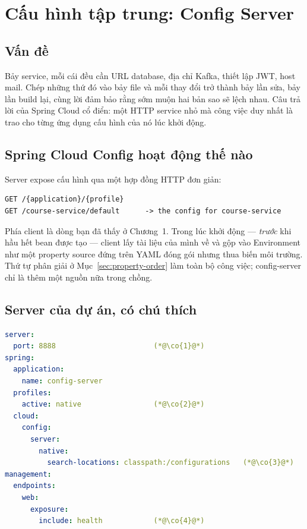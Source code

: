\chapter{Cấu hình tập trung: Config Server}
\label{ch:configserver}

\section{Vấn đề}

Bảy service, mỗi cái đều cần URL database, địa chỉ Kafka, thiết lập JWT,
host mail. Chép những thứ đó vào bảy file  và mỗi
thay đổi trở thành bảy lần sửa, bảy lần build lại, cùng lời đảm bảo rằng
sớm muộn hai bản sao sẽ lệch nhau. Câu trả lời của Spring Cloud cổ điển:
một HTTP service nhỏ mà công việc duy nhất là trao cho từng ứng dụng cấu
hình của nó lúc khởi động.

\section{Spring Cloud Config hoạt động thế nào}

Server expose cấu hình qua một hợp đồng HTTP đơn giản:

\begin{lstlisting}
GET /{application}/{profile}
GET /course-service/default      -> the config for course-service
\end{lstlisting}

Phía client là dòng  
bạn đã thấy ở Chương~1. Trong lúc khởi động --- \emph{trước} khi hầu hết
bean được tạo --- client lấy tài liệu của mình về và gộp vào Environment
như một property source đứng trên YAML đóng gói nhưng thua biến môi
trường. Thứ tự phân giải ở Mục~\ref{sec:property-order} làm toàn bộ công
việc; config-server chỉ là thêm một nguồn nữa trong chồng.

\section{Server của dự án, có chú thích}

\begin{lstlisting}[language=yaml]
server:
  port: 8888                       (*@\co{1}@*)
spring:
  application:
    name: config-server
  profiles:
    active: native                 (*@\co{2}@*)
  cloud:
    config:
      server:
        native:
          search-locations: classpath:/configurations   (*@\co{3}@*)
management:
  endpoints:
    web:
      exposure:
        include: health            (*@\co{4}@*)
\end{lstlisting}

